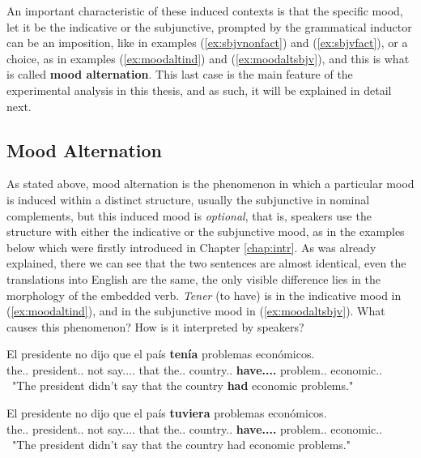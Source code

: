 An important characteristic of these induced contexts is that the specific mood, let it be the indicative or the subjunctive, prompted by the grammatical inductor can be an imposition, like in examples (\ref{ex:sbjvnonfact}) and (\ref{ex:sbjvfact}), or a choice, as in examples (\ref{ex:moodaltind}) and (\ref{ex:moodaltsbjv}), and this is what is called \textbf{mood alternation}. This last case is the main feature of the experimental analysis in this thesis, and as such, it will be explained in detail next.\\ 

\subsection{Mood Alternation}
\label{subsect:moodalt}

As stated above, mood alternation is the phenomenon in which a particular mood is induced within a distinct structure, usually the subjunctive in nominal complements, but this induced mood is \textit{optional}, that is, speakers use the structure with either the indicative or the subjunctive mood, as in the examples below which were firstly introduced in Chapter \ref{chap:intr}. As was already explained, there we can see that the two sentences are almost identical, even the translations into English are the same, the only visible difference lies in the morphology of the embedded verb. \textit{Tener} (to have) is in the indicative mood in (\ref{ex:moodaltind}), and in the subjunctive mood in (\ref{ex:moodaltsbjv}). What causes this phenomenon? How is it interpreted by speakers?\\

\begin{exe}
  \ex
    \begin{xlist}
      \item  {\gll El presidente no dijo que el país \textbf{tenía} problemas económicos.\\ the.\M.\Sg{} president.\M.\Sg{} not say.\Pst.\Pfv.\Ind.\Tsg{} that the.\M.\Sg{} country.\M.\Sg{} \textbf{have.\Pst.\Ipfv.\Ind.\Tsg{}} problem.\M.\Pl{} economic.\M.\Pl{} \\\ "The president didn't say that the country \textbf{had} economic problems."\glt }\label{ex:moodaltind}
      \item {\gll El presidente no dijo que el país \textbf{tuviera} problemas económicos.\\   the.\M.\Sg{} president.\M.\Sg{} not say.\Pst.\Pfv.\Ind.\Tsg{} that the.\M.\Sg{} country.\M.\Sg{} \textbf{have.\Pst.\Ipfv.\Sbjv.\Tsg{}} problem.\M.\Pl{} economic.\M.\Pl{} \\\ "The president didn't say that the country had economic problems."\glt }\label{ex:moodaltsbjv}
    \end{xlist}
\end{exe}

